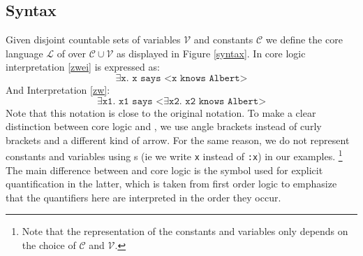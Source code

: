 \subsection{Syntax}
Given disjoint countable sets of variables $\mathcal{V}$ and constants $\mathcal{C}$ we define the core language $\mathcal{L}$ of \nthree over \linebreak
$\mathcal{C}\cup\mathcal{V}$ as displayed in Figure \ref{syntax}. 
In core logic interpretation \ref{zwei} is expressed as:
\[
 \exists \texttt{x. x says <x knows Albert>}
\]
And Interpretation \ref{zw}:
\[
 \exists \texttt{x1. x1 says <}\exists\texttt{x2. x2 knows Albert>} 
\]
Note that this notation is close to the original \nthree notation. To make a clear distinction between core logic and \nthreelogic, 
we use angle brackets instead of curly brackets and
a different kind of arrow. 
For the same reason, we do not represent constants and variables using \iri{}s (ie we write \texttt{x} instead of \texttt{:x}) in our examples.%
\footnote{Note that the representation of the constants and variables only depends on the choice of $\mathcal{C}$ and $\mathcal{V}$.} 
The main difference between \nthreelogic and core logic is the symbol used for explicit quantification in the latter, 
which is taken from first order logic to emphasize 
that the quantifiers here are interpreted in the order they occur.






